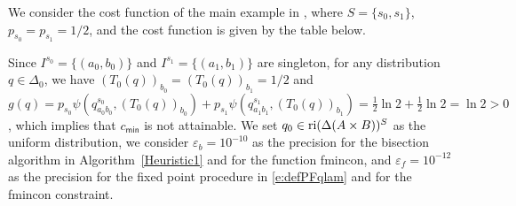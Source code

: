 \documentclass[smallextended,referee,envcountsect,]{svjour3}
\begin{document}
We consider the cost function of the main example in 
{\cite[Example~2.1]{GossnerHernandezNeyman06}}, where 
$S=\{s_0,s_1\}$, 
$p_{s_0}=p_{s_1}=1/2$, and the cost function is given by the table 
below.
\begin{center}
\end{center}
Since $I^{s_0} = \{(a_0,b_0)\}$ and $I^{s_1} = \{(a_1,b_1)\}$ are 
singleton, for any distribution $q\in \Delta_0$, we have
$(T_0(q))_{b_0}=(T_0(q))_{b_1}=1/2$ and $g(q) =  
p_{s_0} 
\psi(q_{a_{0}b_{0}}^{s_0}, (T_0(q))_{b_0}) + p_{s_1} 
\psi(q_{a_{1}b_{1}}^{s_1}, (T_0(q))_{b_1}) = \frac12 \ln2 + \frac12 
\ln2 = \ln 2>0$, which implies that $c_{\textsf{min}}$ is not 
attainable.  We set $q_0\in {\rm ri}(\Delta(A\times B))^S$ as the 
uniform distribution, we consider {$\varepsilon_b=10^{-10}$} as 
the precision 
for the bisection algorithm in Algorithm~\ref{Heuristic1}
and for {the function fmincon}, and 
{$\varepsilon_f=10^{-12}$} as the precision for the fixed point 
procedure in \eqref{e:defPFqlam} and for the fmincon 
constraint.
\end{document}
